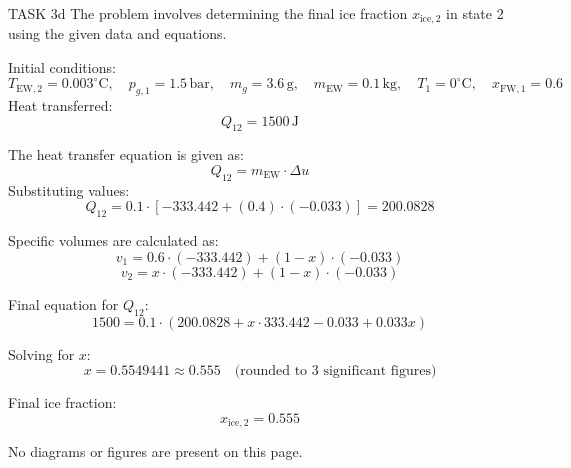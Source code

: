 TASK 3d  
The problem involves determining the final ice fraction \( x_{\text{ice},2} \) in state 2 using the given data and equations.  

Initial conditions:  
\[
T_{\text{EW},2} = 0.003^\circ\text{C}, \quad p_{g,1} = 1.5 \, \text{bar}, \quad m_g = 3.6 \, \text{g}, \quad m_{\text{EW}} = 0.1 \, \text{kg}, \quad T_1 = 0^\circ\text{C}, \quad x_{\text{FW},1} = 0.6
\]  
Heat transferred:  
\[
Q_{12} = 1500 \, \text{J}
\]  

The heat transfer equation is given as:  
\[
Q_{12} = m_{\text{EW}} \cdot \Delta u
\]  
Substituting values:  
\[
Q_{12} = 0.1 \cdot \left[ -333.442 + (0.4) \cdot (-0.033) \right] = 200.0828
\]  

Specific volumes are calculated as:  
\[
v_1 = 0.6 \cdot (-333.442) + (1 - x) \cdot (-0.033)
\]  
\[
v_2 = x \cdot (-333.442) + (1 - x) \cdot (-0.033)
\]  

Final equation for \( Q_{12} \):  
\[
1500 = 0.1 \cdot \left( 200.0828 + x \cdot 333.442 - 0.033 + 0.033x \right)
\]  

Solving for \( x \):  
\[
x = 0.5549441 \approx 0.555 \quad \text{(rounded to 3 significant figures)}
\]  

Final ice fraction:  
\[
x_{\text{ice},2} = 0.555
\]  

No diagrams or figures are present on this page.